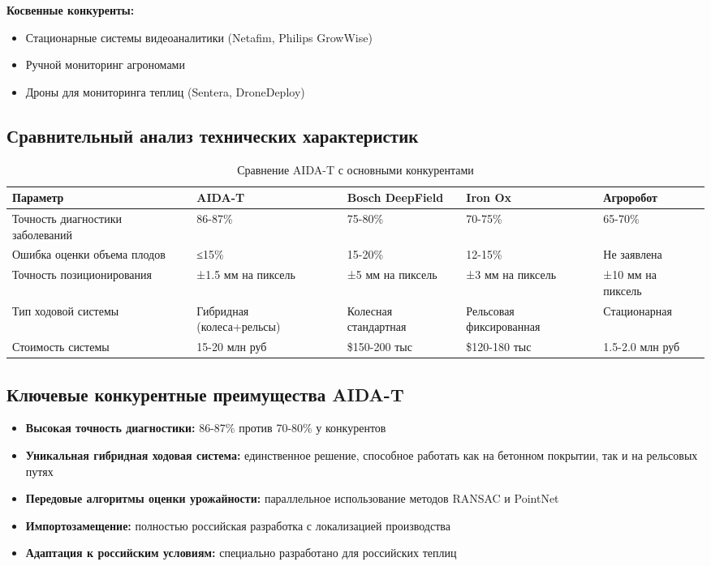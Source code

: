 \documentclass[12pt,a4paper]{article}
\begin{document}
\textbf{Косвенные конкуренты:}
\begin{itemize}
    \item Стационарные системы видеоаналитики (Netafim, Philips GrowWise)
    \item Ручной мониторинг агрономами
    \item Дроны для мониторинга теплиц (Sentera, DroneDeploy)
\end{itemize}

\subsection{Сравнительный анализ технических характеристик}

\begin{table}[h]
\centering
\begin{tabular}{|p{4cm}|p{2.5cm}|p{2.5cm}|p{2.5cm}|p{2.5cm}|}
\hline
\textbf{Параметр} & \textbf{AIDA-T} & \textbf{Bosch DeepField} & \textbf{Iron Ox} & \textbf{Агроробот} \\
\hline
Точность диагностики заболеваний & 86-87\% & 75-80\% & 70-75\% & 65-70\% \\
\hline
Ошибка оценки объема плодов & ≤15\% & 15-20\% & 12-15\% & Не заявлена \\
\hline
Точность позиционирования & ±1.5 мм на пиксель & ±5 мм на пиксель & ±3 мм на пиксель & ±10 мм на пиксель \\
\hline
Тип ходовой системы & Гибридная (колеса+рельсы) & Колесная стандартная & Рельсовая фиксированная & Стационарная \\
\hline
Стоимость системы & 15-20 млн руб & \$150-200 тыс & \$120-180 тыс & 1.5-2.0 млн руб \\
\hline
\end{tabular}
\caption{Сравнение AIDA-T с основными конкурентами}
\end{table}

\subsection{Ключевые конкурентные преимущества AIDA-T}
\begin{itemize}
    \item \textbf{Высокая точность диагностики:} 86-87\% против 70-80\% у конкурентов
    \item \textbf{Уникальная гибридная ходовая система:} единственное решение, способное работать как на бетонном покрытии, так и на рельсовых путях
    \item \textbf{Передовые алгоритмы оценки урожайности:} параллельное использование методов RANSAC и PointNet
    \item \textbf{Импортозамещение:} полностью российская разработка с локализацией производства
    \item \textbf{Адаптация к российским условиям:} специально разработано для российских теплиц
\end{itemize}
\end{document}
